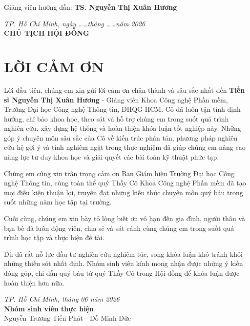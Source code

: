 \documentclass[12pt,a4paper]{report}
\begin{document}
\vspace{0.5cm}
\noindent Giảng viên hướng dẫn: \textbf{TS. Nguyễn Thị Xuân Hương}

\vspace{2cm}
\begin{flushright}
\textit{TP. Hồ Chí Minh, ngày \dots\dots tháng \dots\dots năm 2026}\\[0.2cm]
\textbf{CHỦ TỊCH HỘI ĐỒNG}\\[2cm]
\end{flushright}

\newpage
\setcounter{page}{1}
\chapter*{LỜI CẢM ƠN}

Lời đầu tiên, chúng em xin gửi lời cảm ơn chân thành và sâu sắc nhất đến \textbf{Tiến sĩ Nguyễn Thị Xuân Hương} - Giảng viên Khoa Công nghệ Phần mềm, Trường Đại học Công nghệ Thông tin, ĐHQG-HCM. Cô đã luôn tận tình định hướng, chỉ bảo khoa học, theo sát và hỗ trợ chúng em trong suốt quá trình nghiên cứu, xây dựng hệ thống và hoàn thiện khóa luận tốt nghiệp này. Những góp ý chuyên môn sâu sắc của Cô về kiến trúc phân tán, phương pháp nghiên cứu hệ gợi ý và tính nghiêm ngặt trong thực nghiệm đã giúp chúng em nâng cao năng lực tư duy khoa học và giải quyết các bài toán kỹ thuật phức tạp.

Chúng em cũng xin trân trọng cảm ơn Ban Giám hiệu Trường Đại học Công nghệ Thông tin, cùng toàn thể quý Thầy Cô Khoa Công nghệ Phần mềm đã tạo mọi điều kiện thuận lợi, truyền đạt những kiến thức chuyên môn quý báu trong suốt những năm học tập tại trường.

Cuối cùng, chúng em xin bày tỏ lòng biết ơn vô hạn đến gia đình, người thân và bạn bè đã luôn động viên, chia sẻ và sát cánh cùng chúng em trong suốt quá trình học tập và thực hiện đề tài.

Dù đã rất nỗ lực đầu tư nghiên cứu nghiêm túc, song khóa luận khó tránh khỏi những thiếu sót nhất định. Nhóm sinh viên kính mong nhận được những ý kiến đóng góp, chỉ dẫn quý báu từ quý Thầy Cô trong Hội đồng để khóa luận được hoàn thiện hơn nữa.

\vspace{1cm}
\begin{flushright}
\textit{TP. Hồ Chí Minh, tháng 06 năm 2026}\\[0.2cm]
\textbf{Nhóm sinh viên thực hiện}\\[0.2cm]
Nguyễn Trương Tiến Phát - Đỗ Minh Đức
\end{flushright}
\end{document}
